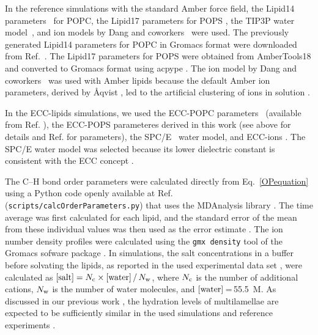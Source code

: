 \documentclass[journal=jctcce,manuscript=article]{achemso}
\begin{document}
In the reference simulations with the standard Amber force field,
the Lipid14 parameters~\cite{dickson14} for POPC, the Lipid17 parameters for POPS \cite{lipid17-future},
the TIP3P water model~\cite{jorgensen83}, and ion models by Dang and coworkers~\cite{smith94,chang1999,dang2006} were used.
The previously generated \cite{botan15} Lipid14 parameters for POPC in Gromacs format were downloaded from Ref.~. 
The Lipid17 parameters for POPS were obtained from AmberTools18 \cite{amber18} 
and converted to Gromacs format using acpype \cite{acpype}.  
The ion model by Dang and coworkers~\cite{smith94,chang1999,dang2006} was used with Amber lipids because
the default Amber ion parameters, derived by {\AA}qvist \cite{aqvist90}, led to the artificial clustering of ions in solution \cite{NMRlipidsIV}.

In the ECC-lipids simulations, we used
the ECC-POPC parameters~\cite{melcr18} (available from Ref. ), 
the ECC-POPS parameteres derived in this work (see above for details and Ref.  for parameters), 
the SPC/E~\cite{Berendsen1987} water model, and ECC-ions \cite{martinek17, kohagen16, Pluharova2014}. 
The SPC/E water model was selected because its lower dielectric constant is consistent with the
ECC concept \cite{leontyev11,leontyev14}.

 
The C--H bond order parameters were calculated directly from Eq.~\ref{OPequation}
using a Python code openly available at Ref.~ ({\tt scripts/calcOrderParameters.py}) 
that uses the MDAnalysis library \cite{agrawal11,gowers16}.  
The time average was first calculated for each lipid, and
the standard error of the mean from these individual values was then used as the
error estimate \cite{botan15,ollila16,NMRlipidsIV}.
The ion number density profiles were calculated using the {\tt gmx density} tool
of the Gromacs sofware package \cite{gromacsMANUAL}.
In simulations, the salt concentrations in a buffer before solvating the lipids, 
as reported in the used experimental data set \cite{roux90},
were calculated as $[{\rm salt}]=N_{\rm c} \times[{\rm water}]\,/\,N_{\rm w}$,
where $N_{\rm c}$ is the number of additional cations, 
$N_{\rm w}$ is the number of water molecules,
and $[{\rm water}]$\,=\,55.5~M. 
As discussed in our previous work \cite{NMRlipidsIV}, the hydration levels of
multilamellae are expected to be sufficiently similar in the used simulations and reference experiments \cite{roux90}.

\end{document}
